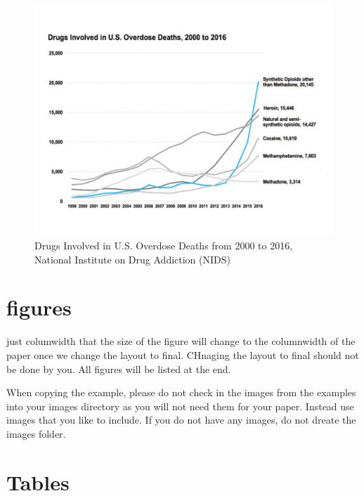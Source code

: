 \documentclass[sigconf]{acmart}
\begin{document}
\begin{figure}[!ht]
  \centering\includegraphics[width=\columnwidth]{images/Figure5.pdf}
  \caption{Drugs Involved in U.S. Overdose Deaths from 2000 to 2016, 
  National Institute on Drug Addiction (NIDS) \cite{nida17}
  }\label{f:Figure5}
\end{figure}



\section{figures}

just columwidth that the size of the figure will change to the
columnwidth of the paper once we change the layout to final. CHnaging
the layout to final should not be done by you. All figures will be
listed at the end.


When copying the example, please do not check in the images from the
examples into your images directory as you will not need them for your
paper. Instead use images that you like to include. If you do not have
any images, do not dreate the images folder.

\section{Tables}
\end{document}
